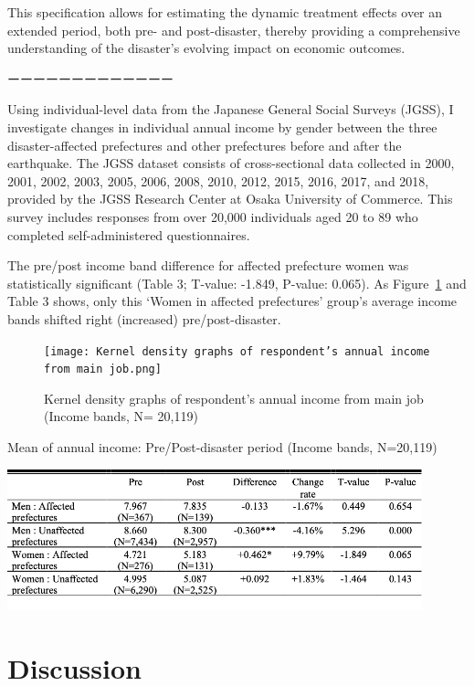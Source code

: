 \documentclass[12pt,halfline,a4paper]{ouparticle}
\begin{document}
This specification allows for estimating the dynamic treatment effects over an extended period, both pre- and post-disaster, thereby providing a comprehensive understanding of the disaster's evolving impact on economic outcomes.

ーーーーーーーーーーーーー

Using individual-level data from the Japanese General Social Surveys (JGSS), I investigate changes in individual annual income by gender between the three disaster-affected prefectures and other prefectures before and after the earthquake. The JGSS dataset consists of cross-sectional data collected in 2000, 2001, 2002, 2003, 2005, 2006, 2008, 2010, 2012, 2015, 2016, 2017, and 2018, provided by the JGSS Research Center at Osaka University of Commerce. This survey includes responses from over 20,000 individuals aged 20 to 89 who completed self-administered questionnaires. 


The pre/post income band difference for affected prefecture women was statistically significant (Table 3; T-value: -1.849, P-value: 0.065). As Figure~\ref{fig:Kernel_density} and Table 3 shows, only this ‘Women in affected prefectures’ group's average income bands shifted right (increased) pre/post-disaster.

\begin{figure}[h!]
    \centering
    \texttt{[image: Kernel density graphs of respondent’s annual income from main job.png]}  %
    \caption{Kernel density graphs of respondent’s annual income from main job (Income bands, N= 20,119)}
    \label{fig:Kernel_density}
\end{figure}


\begin{table}[h!]
    \centering
    \caption{Mean of annual income: Pre/Post-disaster period (Income bands, N=20,119)}
    \label{tab:annual_income}
    \includegraphics[width=0.9\textwidth]{Annual income table.png}  %
\end{table}

\newpage

\section{Discussion}
\label{sec5}
\end{document}
